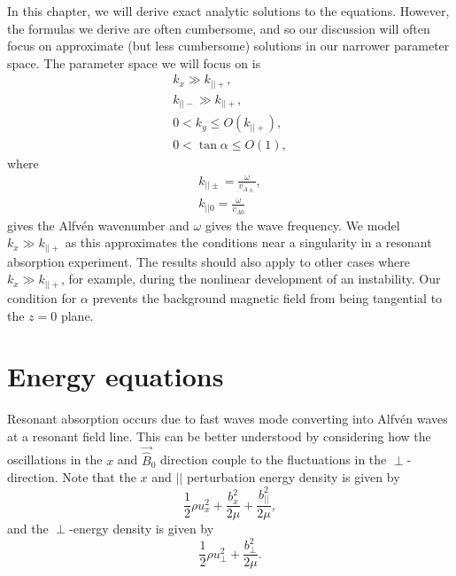 In this chapter, we will derive exact analytic solutions to the equations. However, the formulas we derive are often cumbersome, and so our discussion will often focus on approximate (but less cumbersome) solutions in our narrower parameter space. The parameter space we will focus on is
\begin{gather}
    \label{eq:parm_space_1}
    k_x \gg k_{||+}, \\
     \label{eq:parm_space_2}
    k_{||-} \gg k_{||+}, \\
    \label{eq:parm_space_ky}
    0 < k_y \le O(k_{||+}), \\
    \label{eq:parm_space_4}
    0 < \tan\alpha \le O(1), 
\end{gather}
where 
\begin{gather}
    \label{eq:k_par_pm}
    k_{||\pm} = \frac{\omega}{v_{A\pm}}, \\
    \label{eq:k_par0}
    k_{||0} = \frac{\omega}{v_{A0}}
\end{gather}
gives the Alfv\'en wavenumber and $\omega$ gives the wave frequency. We model $k_x\gg k_{||+}$ as this approximates the conditions near a singularity in a resonant absorption experiment. The results should also apply to other cases where $k_x\gg k_{||+}$, for example, during the nonlinear development of an instability. Our condition for $\alpha$ prevents the background magnetic field from being tangential to the $z=0$ plane.


\section{Energy equations}
\label{sec:chap_4_energy_equations}

Resonant absorption occurs due to fast waves mode converting into Alfv\'en waves at a resonant field line. This can be better understood by considering how the oscillations in the $x$ and $\vec{\hat{B}}_0$ direction couple to the fluctuations in the $\perp$-direction. Note that the $x$ and $||$ perturbation energy density is given by
\[\frac{1}{2}\rho u_x^2 + \frac{b_x^2}{2\mu} + \frac{b_{||}^2}{2\mu},\]
and the $\perp$-energy density is given by
\[\frac{1}{2}\rho u_\perp^2 + \frac{b_\perp^2}{2\mu} .\]

